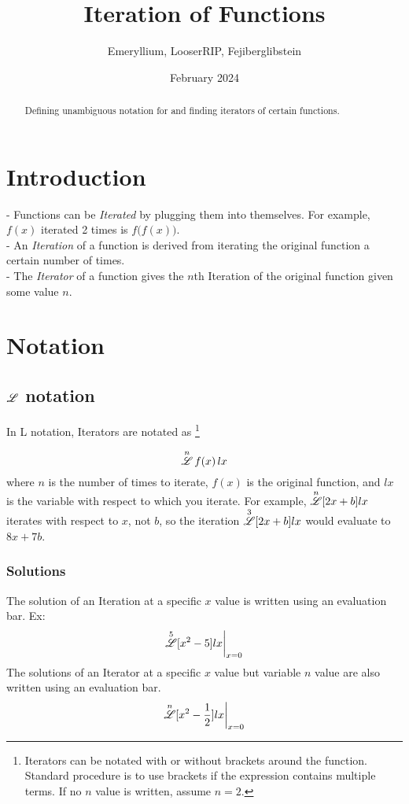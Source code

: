 \documentclass[12pt, letterpaper]{article}
\title{Iteration of Functions}
\author{Emeryllium, LooserRIP, Fejiberglibstein}
\date{February 2024}
\begin{document}
\maketitle

\begin{abstract}
    Defining unambiguous notation for and finding iterators of certain functions.
\end{abstract}

\tableofcontents
\newpage

\section{Introduction}
- Functions can be \textit{Iterated} by plugging them into themselves. For example, $f(x)$ iterated 2 times is $f\big(f(x)\big)$. 
\\
- An \textit{Iteration} of a function is derived from iterating the original function a certain number of times.
\\
- The \textit{Iterator} of a function gives the $n$th Iteration of the original function given some value $n$.


\section{Notation}

\subsection{$\overset{}{\mathscr{L}}$ notation}
In L notation, Iterators are notated as
    \footnote{Iterators can be notated with or without brackets around the function. Standard procedure is to use brackets if the expression contains multiple terms. If no $n$ value is written, assume $n=2$.}

$$ \overset{n}{\mathscr{L}} \, f(x) \, lx$$
where $n$ is the number of times to iterate, $f(x)$ is the original function, and $lx$ is the variable with respect to which you iterate. For example, $\overset{n}{\mathscr{L}} [2x+b] lx$
iterates with respect to $x$, not $b$, so the iteration $\overset{3}{\mathscr{L}} [2x+b] lx$ would evaluate to $8x+7b$.

\subsubsection{Solutions}
The solution of an Iteration at a specific $x$ value is written using an evaluation bar. Ex:
$$\overset{5}{\mathscr{L}}[x^2-5]lx\bigg|_{x=0}$$
The solutions of an Iterator at a specific $x$ value but variable $n$ value are also written using an evaluation bar.
$$\overset{n}{\mathscr{L}}[x^2-\frac{1}{2}]lx\bigg|_{x=0}$$
\end{document}
